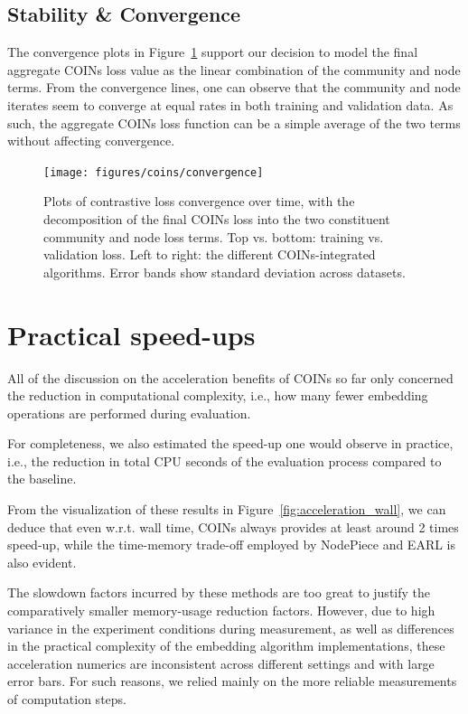 \subsection{Stability \& Convergence}

The convergence plots in Figure~\ref{fig:convergence} support our decision to model the final aggregate COINs loss value as the linear combination of the community and node terms. From the convergence lines, one can observe that the community and node iterates seem to converge at equal rates in both training and validation data. As such, the aggregate COINs loss function can be a simple average of the two terms without affecting convergence.

\begin{figure}[ht!]
\begin{center}
\texttt{[image: figures/coins/convergence]}
\end{center}
\caption[Plots of contrastive loss convergence over time.]{Plots of contrastive loss convergence over time, with the decomposition of the final COINs loss into the two constituent community and node loss terms. Top vs. bottom: training vs. validation loss. Left to right: the different COINs-integrated algorithms. Error bands show standard deviation across datasets.}
\label{fig:convergence}
\end{figure}

\section{Practical speed-ups}
All of the discussion on the acceleration benefits of COINs so far only concerned the reduction in computational complexity, i.e., how many fewer embedding operations are performed during evaluation. 

For completeness, we also estimated the speed-up one would observe in practice, i.e., the reduction in total CPU seconds of the evaluation process compared to the baseline. 

From the visualization of these results in Figure~\ref{fig:acceleration_wall}, we can deduce that even w.r.t. wall time, COINs always provides at least around 2 times speed-up, while the time-memory trade-off employed by NodePiece and EARL is also evident. 

The slowdown factors incurred by these methods are too great to justify the comparatively smaller memory-usage reduction factors. However, due to high variance in the experiment conditions during measurement, as well as differences in the practical complexity of the embedding algorithm implementations, these acceleration numerics are inconsistent across different settings and with large error bars. For such reasons, we relied mainly on the more reliable measurements of computation steps.

